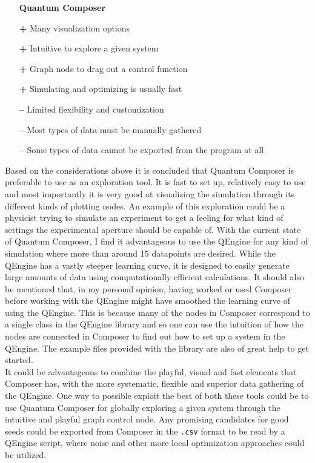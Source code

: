 \documentclass[a4paper, twocolumn]{revtex4-1}
\begin{document}
\begin{itemize}
	\item[] \textbf{Quantum Composer} 
	\item[\bf+] Many visualization options
	\item[\bf+] Intuitive to explore a given system
	\item[\bf+] Graph node to drag out a control function
	\item[\bf+] Simulating and optimizing is usually fast
	\item[\bf{--}] Limited flexibility and customization
	\item[\bf{--}] Most types of data must be manually gathered
	\item[\bf{--}] Some types of data cannot be exported from the program at all
\end{itemize}

Based on the considerations above it is concluded that Quantum Composer is preferable to use as an exploration tool. It is fast to set up, relatively easy to use and most importantly it is very good at visualizing the simulation through its different kinds of plotting nodes. An example of this exploration could be a physicist trying to simulate an experiment to get a feeling for what kind of settings the experimental aperture should be capable of. With the current state of Quantum Composer, I find it advantageous to use the QEngine for any kind of simulation where more than around 15 datapoints are desired. While the QEngine has a vastly steeper learning curve, it is designed to easily generate large amounts of data using computationally efficient calculations. It should also be mentioned that, in my personal opinion, having worked or used Composer before working with the QEngine might have smoothed the learning curve of using the QEngine. This is because many of the nodes in Composer correspond to a single class in the QEngine library and so one can use the intuition of how the nodes are connected in Composer to find out how to set up a system in the QEngine. The example files provided with the library are also of great help to get started.\\

It could be advantageous to combine the playful, visual and fast elements that Composer has, with the more systematic, flexible and superior data gathering of the QEngine. One way to possible exploit the best of both these tools could be to use Quantum Composer for globally exploring a given system through the intuitive and playful graph control node. Any promising candidates for good seeds could be exported from Composer in the \texttt{.csv} format to be read by a QEngine script, where noise and other more local optimization approaches could be utilized.
\end{document}
